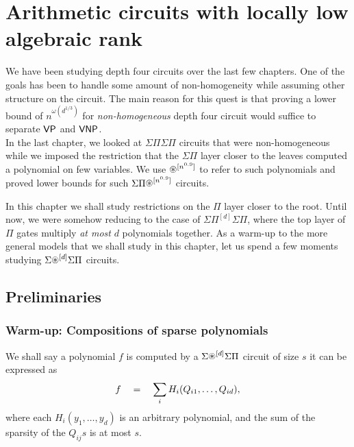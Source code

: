 \chapter{Arithmetic circuits with locally low algebraic rank}
\label{chap:lowAlgRank}

\newcommand{\spnew}{\Sigma\circast^{\set{\!\!\set{k}\!\!}}\Sigma\Pi}
\newcommand{\SASP}[1]{\Sigma\circast^{\set{\!\!\set{#1}\!\!}}\Sigma\Pi}
\newcommand{\spnewn}{\Sigma{\Pi^{(n)}}\Sigma\Pi}
\newcommand{\spnewbounded}{\Sigma{\Pi^{(k)}}\Sigma\Pi^{[d]}}
\newcommand{\spgeneral}{\Sigma{\Gamma^{(k)}}\Sigma\Pi}
\newcommand{\algRank}{\operatorname{\mathrm{algRank}}}



\def\h{\mathsf{Hom}}

We have been studying depth four circuits over the last few chapters. One of the goals has been to handle some amount of non-homogeneity while assuming other structure on the circuit. The main reason for this quest is that proving a lower bound of $n^{\omega(d^{1/3})}$ for \emph{non-homogeneous} depth four circuit would suffice to separate $\mathsf{VP}$ and $\mathsf{VNP}$. \\

In the last chapter, we looked at $\Sigma\Pi\Sigma\Pi$ circuits that were non-homogeneous while we imposed the restriction that the $\Sigma\Pi$ layer closer to the leaves computed a polynomial on few variables. We use $\circast^{[n^{0.9}]}$ to refer to such polynomials and proved lower bounds for such $\SPA^{[n^{0.9}]}$ circuits. 

In this chapter we shall study restrictions on the $\Pi$ layer closer to the root. Until now, we were somehow reducing to the case of $\Sigma\Pi^{[d]}\Sigma\Pi$, where the top layer of $\Pi$ gates multiply \emph{at most} $d$ polynomials together. As a warm-up to the more general models that we shall study in this chapter, let us spend a few moments studying $\Sigma\circast^{[d]}\Sigma\Pi$ circuits. 

\section{Preliminaries}

\subsection{Warm-up: Compositions of sparse polynomials}\label{sec:low-algrank-warmup}

\begin{definition}
We shall say a polynomial $f$ is computed by a $\Sigma\circast^{[d]}\Sigma\Pi$ circuit of size $s$ it can be expressed as
\[
f \quad = \quad \sum_i H_i(Q_{i1},\ldots, Q_{id}),
\]
where each $H_i(y_1,\ldots, y_d)$ is an arbitrary polynomial, and the sum of the sparsity of the $Q_{ij}s$ is at most $s$. 
\end{definition}

